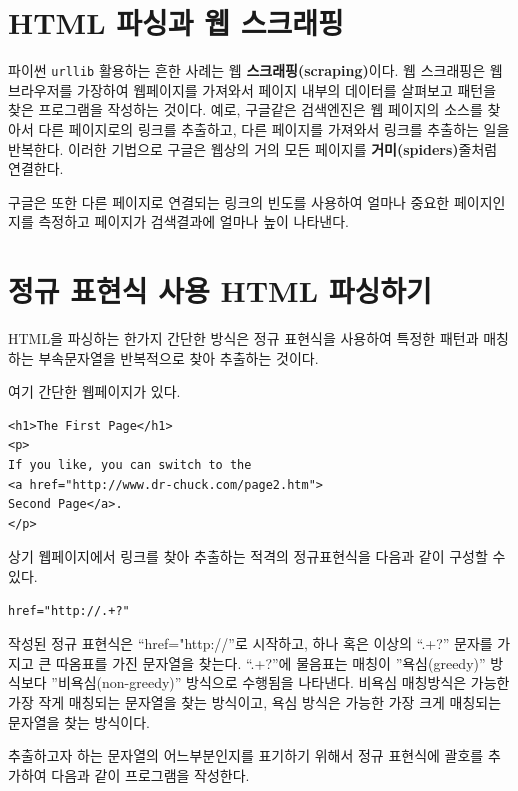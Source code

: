 \section{HTML 파싱과 웹 스크래핑}


파이썬 {\tt urllib} 활용하는 흔한 사례는 웹 {\bf 스크래핑(scraping)}이다.
웹 스크래핑은 웹브라우저를 가장하여 웹페이지를 가져와서 페이지 내부의 데이터를 살펴보고 패턴을 찾은 프로그램을 작성하는 것이다.
예로, 구글같은 검색엔진은 웹 페이지의 소스를 찾아서 다른 페이지로의 링크를 추출하고, 다른 페이지를 가져와서 링크를 추출하는 일을 반복한다.
이러한 기법으로 구글은 웹상의 거의 모든 페이지를 {\bf 거미(spiders)}줄처럼 연결한다.

구글은 또한 다른 페이지로 연결되는 링크의 빈도를 사용하여 얼마나 중요한 페이지인지를 측정하고 
페이지가 검색결과에 얼마나 높이 나타낸다.

\section{정규 표현식 사용 HTML 파싱하기}

HTML을 파싱하는 한가지 간단한 방식은 정규 표현식을 사용하여 특정한 패턴과 매칭하는 부속문자열을 반복적으로 찾아 추출하는 것이다.

여기 간단한 웹페이지가 있다.

\beforeverb
\begin{verbatim}
<h1>The First Page</h1>
<p>
If you like, you can switch to the
<a href="http://www.dr-chuck.com/page2.htm">
Second Page</a>.
</p>
\end{verbatim}
\afterverb
%

상기 웹페이지에서 링크를 찾아 추출하는 적격의 정규표현식을 다음과 같이 구성할 수 있다.

\beforeverb
\begin{verbatim}
href="http://.+?"
\end{verbatim}
\afterverb
%

작성된 정규 표현식은 ``href="http://''로 시작하고, 하나 혹은 이상의 ``.+?'' 문자를 가지고 큰 따옴표를 가진 문자열을 찾는다.
``.+?''에 물음표는 매칭이 ''욕심(greedy)'' 방식보다 ''비욕심(non-greedy)'' 방식으로 수행됨을 나타낸다. 
비욕심 매칭방식은 가능한 가장 작게 매칭되는 문자열을 찾는 방식이고, 욕심 방식은 가능한 가장 크게 매칭되는 문자열을 찾는 방식이다.


추출하고자 하는 문자열의 어느부분인지를 표기하기 위해서 정규 표현식에 괄호를 추가하여 다음과 같이 프로그램을 작성한다.


